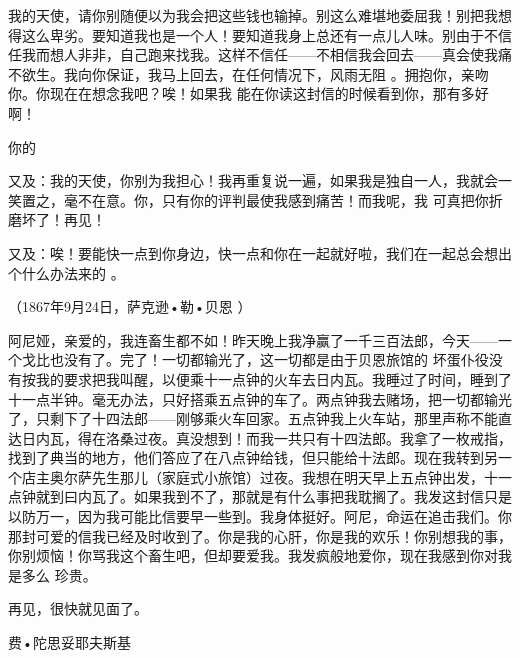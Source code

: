 \documentclass{article}
\begin{document}
我的天使，请你别随便以为我会把这些钱也输掉。别这么难堪地委屈我！别把我想得这么卑劣。要知道我也是一个人！要知道我身上总还有一点儿人味。别由于不信任我而想人非非，自己跑来找我。这样不信任——不相信我会回去——真会使我痛不欲生。我向你保证，我马上回去，在任何情况下，风雨无阻
\newpage
。拥抱你，亲吻你。你现在在想念我吧？唉！如果我
能在你读这封信的时候看到你，那有多好啊！ 


你的 


又及：我的天使，你别为我担心！我再重复说一遍，如果我是独自一人，我就会一笑置之，毫不在意。你，只有你的评判最使我感到痛苦！而我呢，我
可真把你折磨坏了！再见！ 

又及：唉！要能快一点到你身边，快一点和你在一起就好啦，我们在一起总会想出个什么办法来的
。 

（1867年9月24日，萨克逊•勒•贝恩
） 

阿尼娅，亲爱的，我连畜生都不如！昨天晚上我净赢了一千三百法郎，今天——一个戈比也没有了。完了！一切都输光了，这一切都是由于贝恩旅馆的
\newpage
坏蛋仆役没有按我的要求把我叫醒，以便乘十一点钟的火车去日内瓦。我睡过了时间，睡到了十一点半钟。毫无办法，只好搭乘五点钟的车了。两点钟我去赌场，把一切都输光了，只剩下了十四法郎——刚够乘火车回家。五点钟我上火车站，那里声称不能直达日内瓦，得在洛桑过夜。真没想到！而我一共只有十四法郎。我拿了一枚戒指，找到了典当的地方，他们答应了在八点钟给钱，但只能给十法郎。现在我转到另一个店主奥尔萨先生那儿（家庭式小旅馆）过夜。我想在明天早上五点钟出发，十一点钟就到曰内瓦了。如果我到不了，那就是有什么事把我耽搁了。我发这封信只是以防万一，因为我可能比信要早一些到。我身体挺好。阿尼，命运在追击我们。你那封可爱的信我已经及时收到了。你是我的心肝，你是我的欢乐！你别想我的事，你别烦恼！你骂我这个畜生吧，但却要爱我。我发疯般地爱你，现在我感到你对我是多么
珍贵。 


再见，很快就见面了。 


\newpage
费•陀思妥耶夫斯基
\end{document}
